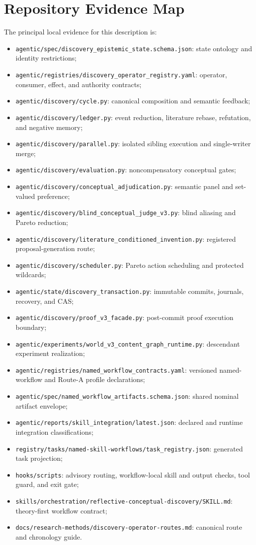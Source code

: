 \documentclass[11pt]{article}
\begin{document}
\appendix
\section{Repository Evidence Map}

The principal local evidence for this description is:
\begin{itemize}[leftmargin=*]
  \item \texttt{agentic/spec/discovery\_epistemic\_state.schema.json}: state ontology and identity restrictions;
  \item \texttt{agentic/registries/discovery\_operator\_registry.yaml}: operator, consumer, effect, and authority contracts;
  \item \texttt{agentic/discovery/cycle.py}: canonical composition and semantic feedback;
  \item \texttt{agentic/discovery/ledger.py}: event reduction, literature rebase, refutation, and negative memory;
  \item \texttt{agentic/discovery/parallel.py}: isolated sibling execution and single-writer merge;
  \item \texttt{agentic/discovery/evaluation.py}: noncompensatory conceptual gates;
  \item \texttt{agentic/discovery/conceptual\_adjudication.py}: semantic panel and set-valued preference;
  \item \texttt{agentic/discovery/blind\_conceptual\_judge\_v3.py}: blind aliasing and Pareto reduction;
  \item \texttt{agentic/discovery/literature\_conditioned\_invention.py}: registered proposal-generation route;
  \item \texttt{agentic/discovery/scheduler.py}: Pareto action scheduling and protected wildcards;
  \item \texttt{agentic/state/discovery\_transaction.py}: immutable commits, journals, recovery, and CAS;
  \item \texttt{agentic/discovery/proof\_v3\_facade.py}: post-commit proof execution boundary;
  \item \texttt{agentic/experiments/world\_v3\_content\_graph\_runtime.py}: descendant experiment realization;
  \item \texttt{agentic/registries/named\_workflow\_contracts.yaml}: versioned named-workflow and Route-A profile declarations;
  \item \texttt{agentic/spec/named\_workflow\_artifacts.schema.json}: shared nominal artifact envelope;
  \item \texttt{agentic/reports/skill\_integration/latest.json}: declared and runtime integration classifications;
  \item \texttt{registry/tasks/named-skill-workflows/task\_registry.json}: generated task projection;
  \item \texttt{hooks/scripts}: advisory routing, workflow-local skill and output checks, tool guard, and exit gate;
  \item \texttt{skills/orchestration/reflective-conceptual-discovery/SKILL.md}: theory-first workflow contract;
  \item \texttt{docs/research-methods/discovery-operator-routes.md}: canonical route and chronology guide.
\end{itemize}
\end{document}
